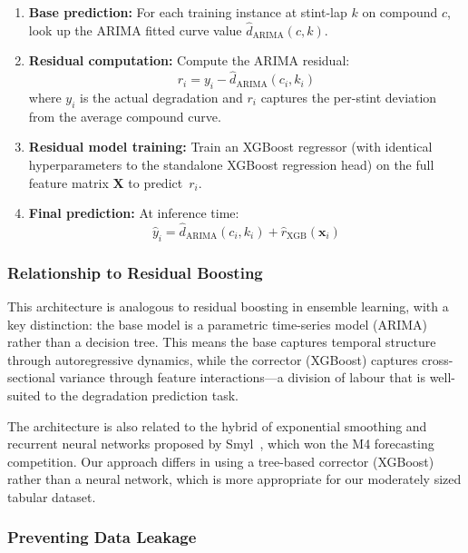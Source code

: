 \documentclass[journal,twoside]{IEEEtran}
\begin{document}
\begin{enumerate}
  \item \textbf{Base prediction:}  For each training instance at
  stint-lap $k$ on compound $c$, look up the ARIMA fitted curve value
  $\hat{d}_{\text{ARIMA}}(c, k)$.

  \item \textbf{Residual computation:}  Compute the ARIMA residual:
  \begin{equation}
    r_i = y_i - \hat{d}_{\text{ARIMA}}(c_i, k_i)
    \label{eq:residual}
  \end{equation}
  where $y_i$ is the actual degradation and $r_i$ captures the
  per-stint deviation from the average compound curve.

  \item \textbf{Residual model training:}  Train an XGBoost regressor
  (with identical hyperparameters to the standalone XGBoost regression
  head) on the full feature matrix $\mathbf{X}$ to predict~$r_i$.

  \item \textbf{Final prediction:}  At inference time:
  \begin{equation}
    \hat{y}_i = \hat{d}_{\text{ARIMA}}(c_i, k_i) +
    \hat{r}_{\text{XGB}}(\mathbf{x}_i)
    \label{eq:hybrid}
  \end{equation}
\end{enumerate}

\subsubsection{Relationship to Residual Boosting}

This architecture is analogous to residual boosting in ensemble
learning, with a key distinction: the base model is a parametric
time-series model (ARIMA) rather than a decision tree.  This means
the base captures temporal structure through autoregressive dynamics,
while the corrector (XGBoost) captures cross-sectional variance
through feature interactions---a division of labour that is
well-suited to the degradation prediction task.

The architecture is also related to the hybrid of exponential smoothing
and recurrent neural networks proposed by
Smyl~\cite{residual_boost2021}, which won the M4 forecasting
competition.  Our approach differs in using a tree-based corrector
(XGBoost) rather than a neural network, which is more appropriate for
our moderately sized tabular dataset.

\subsubsection{Preventing Data Leakage}
\end{document}
